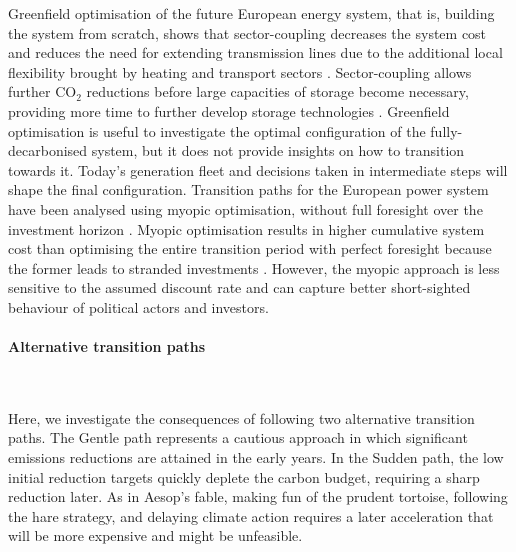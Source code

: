 \documentclass[5p]{elsarticle} %
\begin{document}
Greenfield optimisation of the future European energy system, that is, building the system from scratch, shows that sector-coupling decreases the system cost and reduces the need for extending transmission lines due to the additional local flexibility brought by heating and transport sectors \cite{Brown_2018}. Sector-coupling allows further CO$_2$ reductions before large capacities of storage become necessary, providing more time to further develop storage technologies \cite{Victoria_2019_storage}. Greenfield optimisation is useful to investigate the optimal configuration of the fully-decarbonised system, but it does not provide insights on how to transition towards it. Today's generation fleet and decisions taken in intermediate steps will shape the final configuration. Transition paths for the European power system have been analysed using myopic optimisation, without full foresight over the investment horizon \cite{Bogdanov_2019, Plesmann_2017, Gerbaulet_2019, Poncelet_2016}. Myopic optimisation results in higher cumulative system cost than optimising the entire transition period with perfect foresight because the former leads to stranded investments \cite{Gerbaulet_2019, Heuberger_2018}. However, the myopic approach is less sensitive to the assumed discount rate and can capture better short-sighted behaviour of political actors and investors. 

\paragraph{\textbf{Alternative transition paths}} \



Here, we investigate the consequences of following two alternative transition paths. The Gentle path represents a cautious approach in which significant emissions reductions are attained in the early years. In the Sudden path, the low initial reduction targets quickly deplete the carbon budget, requiring a sharp reduction later. As in Aesop's fable, making fun of the prudent tortoise, following the hare strategy, and delaying climate action requires a later acceleration that will be more expensive and might be unfeasible. 
\end{document}
